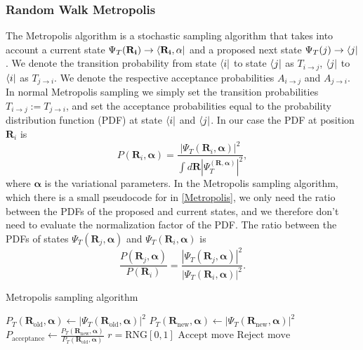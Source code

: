 \subsubsection{Random Walk Metropolis}\label{sec:rwm}

The Metropolis algorithm is a stochastic sampling algorithm that takes into account a current state $\Psi_T(\mathbf{R_i})\to\bra{\mathbf{R_i}, \alpha}$ and a proposed next state $\Psi_T(j)\to\bra{j}$. We denote the transition probability from state $\bra{i}$ to state $\bra{j}$ as $T_{i\to j}$, $\bra{j}$ to $\bra{i}$ as $T_{j\to i}$. We denote the respective acceptance probabilities $A_{i\to j}$ and $A_{j\to i}$. In normal Metropolis sampling we simply set the transition probabilities $T_{i\to j}:=T_{j\to i}$, and set the acceptance probabilities equal to the probability distribution function (PDF) at state $\bra{i}$ and $\bra{j}$. In our case the PDF at position $\mathbf{R}_i$ is
\begin{equation}
    P(\mathbf{R}_i, \mathbf{\alpha}) = \frac{|\Psi_T(\mathbf{R}_i, \mathbf{\alpha})|^2}{\int d\mathbf{R}|\Psi_T^(\mathbf{R}, \mathbf{\alpha})|^2}, 
\end{equation}
where $\mathbf{\alpha}$ is the variational parameters. In the Metropolis sampling algorithm, which there is a small pseudocode for in \ref{Metropolis}, we only need the ratio between the PDFs of the proposed and current states, and we therefore don't need to evaluate the normalization factor of the PDF. The ratio between the PDFs of states $\Psi_T(\mathbf{R}_{j}, \mathbf{\alpha})$ and $\Psi_T(\mathbf{R}_i, \mathbf{\alpha})$ is 
\begin{equation}
    \frac{P(\mathbf{R}_j, \mathbf{\alpha})}{P(\mathbf{R}_i)} = \frac{|\Psi_T(\mathbf{R}_j, \mathbf{\alpha})|^2}{|\Psi_T(\mathbf{R}_i, \mathbf{\alpha})|^2}.
\end{equation}


\begin{algorithm}
\caption{Metropolis sampling algorithm}\label{Metropolis}
\begin{algorithmic}[1]
\State $P_T(\mathbf{R}_{\text{old}}, \mathbf{\alpha}) \gets |\Psi_T(\mathbf{R}_{\text{old}}, \mathbf{\alpha})|^2$
\State $P_T(\mathbf{R}_{\text{new}}, \mathbf{\alpha}) \gets |\Psi_T(\mathbf{R}_{\text{new}}, \mathbf{\alpha})|^2$
\State $P_{\text{acceptance}}\gets\frac{P_T(\mathbf{R}_{\text{new}}, \mathbf{\alpha})}{P_T(\mathbf{R}_{\text{old}}, \mathbf{\alpha})}$
\State $r = \text{RNG}[0,1]$
\State $\text{Accept move}$
\Else 
\State $\text{Reject move}$
\EndIf
\EndProcedure
\end{algorithmic}
\end{algorithm}

